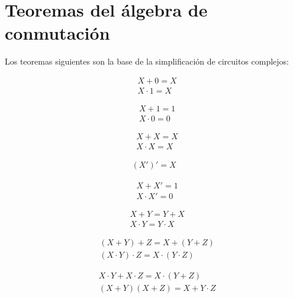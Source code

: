\documentclass[11pt,fleqn]{book} %
\begin{document}
\section{Teoremas del álgebra de conmutación}
Los teoremas siguientes son la base de la simplificación de circuitos complejos:
\begin{theorem}[Identidad]
\begin{align}
& X+0=X\\
& X\cdot 1=X
\end{align}
\end{theorem}
\begin{theorem}
\begin{align}
& X+1=1\\
& X\cdot 0=0
\end{align}
\end{theorem}
\begin{theorem}
\label{theo:potenciasidenticas}
\begin{align}
& X+X=X\\
& X\cdot X=X
\end{align}
\end{theorem}
\begin{theorem}[Involución]
\begin{align}
\left(X'\right)'=X
\end{align}
\end{theorem}
\begin{theorem}[Complementos]
\begin{align}
& X+X'=1\\
& X\cdot X'=0
\end{align}
\end{theorem}
\begin{theorem}[Conmutatividad]
\begin{align}
& X+Y=Y+X\\
& X\cdot Y=Y\cdot X
\end{align}
\end{theorem}
\begin{theorem}[Asociatividad]
\begin{align}
& (X+Y)+Z=X+(Y+Z)\\
& (X\cdot Y)\cdot Z=X\cdot (Y\cdot Z)
\end{align}
\end{theorem}
\begin{theorem}[Distributividad]
\begin{align}
& X\cdot Y+X\cdot Z=X\cdot(Y+Z)\\
& (X+Y)(X+Z)=X+Y\cdot Z
\end{align}
\end{theorem}
\end{document}
